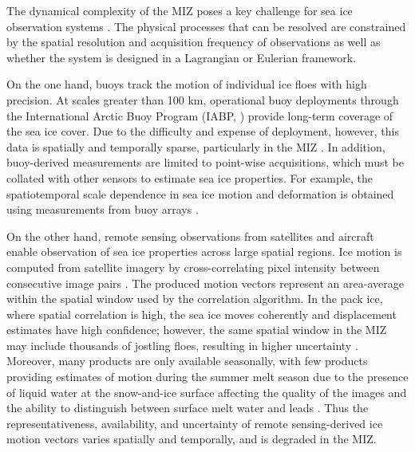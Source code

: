 \documentclass[review, jog]{igs}
\begin{document}
The dynamical complexity of the MIZ poses a key challenge for sea ice observation systems
\citep{webster2022_ObservingArctic, gerland2019_EssentialGaps, sandvenSeaIceRemote2023}.
The physical processes that can be resolved are constrained by the spatial resolution and acquisition frequency of observations as well as whether the system is designed in a Lagrangian or Eulerian framework.

On the one hand, buoys track the motion of individual ice floes with high precision.
At scales greater than 100 km, operational buoy deployments through the International Arctic Buoy Program (IABP, \cite{rigor2008}) provide long-term coverage of the sea ice cover. 
Due to the difficulty and expense of deployment, however, this data is spatially and temporally sparse, particularly in the MIZ \citep{gerland2019_EssentialGaps, brunette2022_NewStatedependent}.
In addition, buoy-derived measurements are limited to point-wise acquisitions, which must be collated with other sensors to estimate sea ice properties.
For example, the spatiotemporal scale dependence in sea ice motion and deformation is obtained using measurements from buoy arrays \citep{Hutchings2011, itkin2017_ThinIce}.

On the other hand, remote sensing observations from satellites and aircraft enable observation of sea ice properties across large spatial regions.
Ice motion is computed from satellite imagery by cross-correlating pixel intensity between consecutive image pairs \citep{ninnis1986_AutomatedExtraction, kwok1998_SeaIce}.
The produced motion vectors represent an area-average within the spatial window used by the correlation algorithm.
In the pack ice, where spatial correlation is high, the sea ice moves coherently and displacement estimates have high confidence; however, the same spatial window in the MIZ may include thousands of jostling floes, resulting in higher uncertainty \citep{sumata2014_IntercomparisonArctic, gui2020_ValidationRemotesensing}. 
Moreover, many products are only available seasonally, with few products providing estimates of motion during the summer melt season due to the presence of liquid water at the snow-and-ice surface affecting the quality of the images and the ability to distinguish between surface melt water and leads \citep{lavergne2010_SeaIce, girard-ardhuin2012_EnhancedArctic}. 
Thus the representativeness, availability, and uncertainty of remote sensing-derived ice motion vectors varies spatially and temporally, and is degraded in the MIZ.
\end{document}
